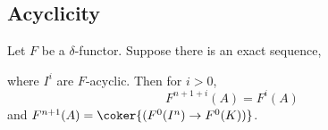 \documentclass[12pt]{article}
\begin{document}
\subsection{Acyclicity}

\begin{lemma}
Let $F$ be a $\delta$-functor. Suppose there is an exact sequence,
\begin{center}
\end{center}
where $I^i$ are $F$-acyclic. Then for $i > 0$,
\[ F^{n + 1 + i}(A) = F^i(A) \]
and $F^{n+1}(A) = \coker{(F^0(I^{n}) \to F^0(K))}$. 
\end{lemma}
\end{document}
